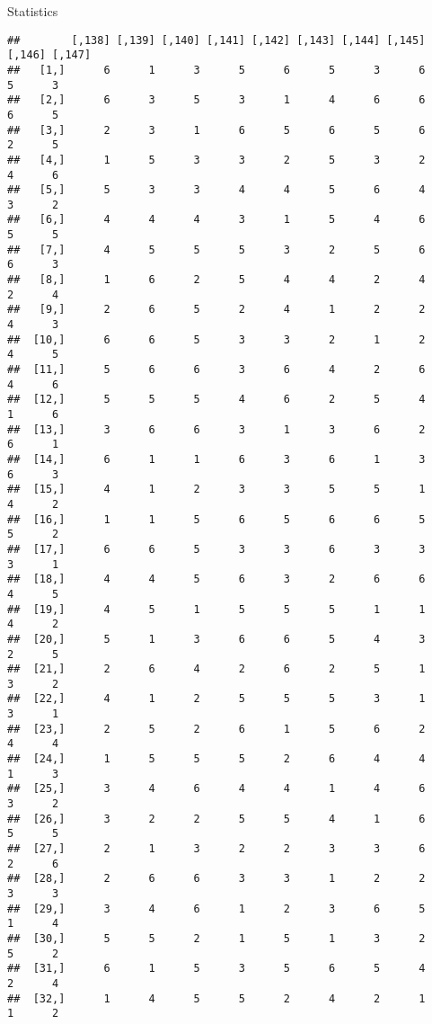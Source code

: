 \documentclass[
  ignorenonframetext,
]{beamer}
\begin{document}
\begin{frame}[fragile]{Statistics}
\begin{verbatim}
##        [,138] [,139] [,140] [,141] [,142] [,143] [,144] [,145] [,146] [,147]
##   [1,]      6      1      3      5      6      5      3      6      5      3
##   [2,]      6      3      5      3      1      4      6      6      6      5
##   [3,]      2      3      1      6      5      6      5      6      2      5
##   [4,]      1      5      3      3      2      5      3      2      4      6
##   [5,]      5      3      3      4      4      5      6      4      3      2
##   [6,]      4      4      4      3      1      5      4      6      5      5
##   [7,]      4      5      5      5      3      2      5      6      6      3
##   [8,]      1      6      2      5      4      4      2      4      2      4
##   [9,]      2      6      5      2      4      1      2      2      4      3
##  [10,]      6      6      5      3      3      2      1      2      4      5
##  [11,]      5      6      6      3      6      4      2      6      4      6
##  [12,]      5      5      5      4      6      2      5      4      1      6
##  [13,]      3      6      6      3      1      3      6      2      6      1
##  [14,]      6      1      1      6      3      6      1      3      6      3
##  [15,]      4      1      2      3      3      5      5      1      4      2
##  [16,]      1      1      5      6      5      6      6      5      5      2
##  [17,]      6      6      5      3      3      6      3      3      3      1
##  [18,]      4      4      5      6      3      2      6      6      4      5
##  [19,]      4      5      1      5      5      5      1      1      4      2
##  [20,]      5      1      3      6      6      5      4      3      2      5
##  [21,]      2      6      4      2      6      2      5      1      3      2
##  [22,]      4      1      2      5      5      5      3      1      3      1
##  [23,]      2      5      2      6      1      5      6      2      4      4
##  [24,]      1      5      5      5      2      6      4      4      1      3
##  [25,]      3      4      6      4      4      1      4      6      3      2
##  [26,]      3      2      2      5      5      4      1      6      5      5
##  [27,]      2      1      3      2      2      3      3      6      2      6
##  [28,]      2      6      6      3      3      1      2      2      3      3
##  [29,]      3      4      6      1      2      3      6      5      1      4
##  [30,]      5      5      2      1      5      1      3      2      5      2
##  [31,]      6      1      5      3      5      6      5      4      2      4
##  [32,]      1      4      5      5      2      4      2      1      1      2

\end{verbatim}
\end{frame}
\end{document}
